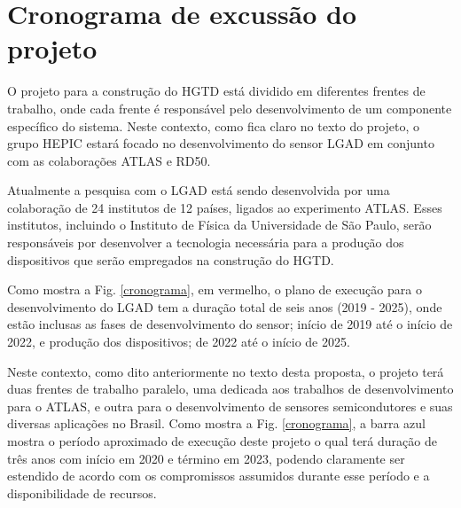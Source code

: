 \chapter{Cronograma de excussão do projeto}

O projeto para a construção do HGTD está dividido em diferentes frentes de trabalho, onde cada frente é responsável pelo desenvolvimento de um componente específico do sistema. Neste contexto, como fica claro no texto do projeto, o grupo HEPIC estará focado no desenvolvimento do sensor LGAD em conjunto com as colaborações ATLAS e RD50. 

Atualmente a pesquisa com o LGAD está sendo desenvolvida por uma colaboração de 24 institutos de 12 países, ligados ao experimento ATLAS. Esses institutos, incluindo o Instituto de Física da Universidade de São Paulo, serão responsáveis por desenvolver a tecnologia necessária para a produção dos dispositivos que serão empregados na construção do HGTD.

Como mostra a Fig. \ref{cronograma}, em vermelho, o plano de execução para o desenvolvimento do LGAD tem a duração total de seis anos (2019 - 2025), onde estão inclusas as fases de desenvolvimento do sensor; início de 2019 até o início de 2022, e produção dos dispositivos; de 2022 até o início de 2025. 

Neste contexto, como dito anteriormente no texto desta proposta, o projeto terá duas frentes de trabalho paralelo, uma dedicada aos trabalhos de desenvolvimento para o ATLAS, e outra para o desenvolvimento de sensores semicondutores e suas diversas aplicações no Brasil. Como mostra a Fig. \ref{cronograma}, a barra azul mostra o período aproximado de execução deste projeto o qual terá duração de três anos com início em 2020 e término em 2023, podendo claramente ser estendido de acordo com os compromissos assumidos durante esse período e a disponibilidade de recursos.

